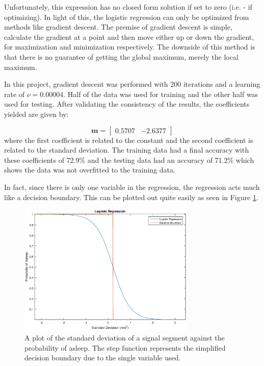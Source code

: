                 Unfortunately, this expression has no closed form solution if set to zero (i.e. - if optimizing). In light of this, the logistic regression can only be optimized from methods like gradient descent. The premise of gradient descent is simple, calculate the gradient at a point and then move either up or down the gradient, for maximization and minimization respectively. The downside of this method is that there is no guarantee of getting the global maximum, merely the local maximum. 

                In this project, gradient descent was performed with 200 iterations and a learning rate of $\nu = 0.00004$. Half of the data was used for training and the other half was used for testing. After validating the consistency of the results, the coefficients yielded are given by:

                \begin{equation}
                    \mathbf{m} = \begin{bmatrix} 0.5707 & -2.6377 \end{bmatrix}
                \end{equation}
                where the first coefficient is related to the constant and the second coefficient is related to the standard deviation. The training data had a final accuracy with these coefficients of 72.9\% and the testing data had an accuracy of 71.2\% which shows the data was not overfitted to the training data.

                In fact, since there is only one variable in the regression, the regression acts much like a decision boundary. This can be plotted out quite easily as seen in Figure \ref{img_regression}.

                \begin{figure}[h]
                    \includegraphics[width=0.75\textwidth]{Images/logistic_regression.eps}
                    \centering
                    \caption{A plot of the standard deviation of a signal segment against the probability of asleep. The step function represents the simplified decision boundary due to the single variable used.}
                    \label{img_regression}
                \end{figure}

